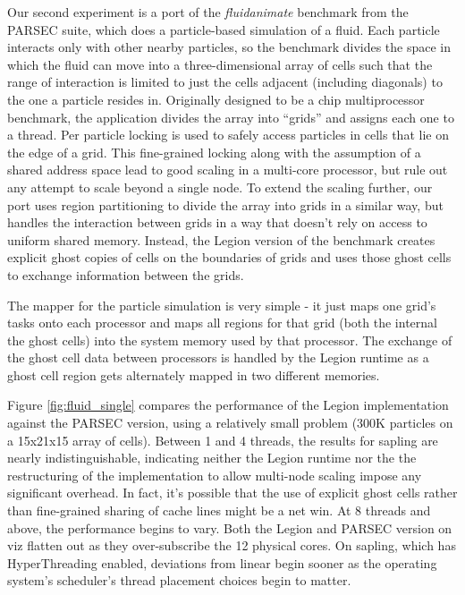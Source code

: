 Our second experiment is a port of the \emph{fluidanimate} benchmark from the PARSEC suite\cite{bienia11benchmarking},
which does a particle-based simulation of a fluid.  Each particle interacts only with other nearby
particles, so the benchmark divides the space in which the fluid
can move into a three-dimensional array of cells such that the range of interaction is limited to just the
cells adjacent (including diagonals) to the one a particle resides in.  Originally designed to be a
chip multiprocessor benchmark, the application divides the array into ``grids'' and assigns each one to 
a thread.  Per particle locking is used to safely access particles in cells that lie
on the edge of a grid.  This fine-grained locking along with the assumption of a shared address space lead to
good scaling in a multi-core processor, but rule out any attempt to scale beyond a single node.  To extend the
scaling further, our port uses region partitioning to divide the array into grids in a similar
way, but handles the interaction between grids in a way that doesn't rely on access to uniform shared memory.
Instead, the Legion version of the benchmark creates explicit ghost copies of cells on the boundaries of grids
and uses those ghost cells to exchange information between the grids.

The mapper for the particle simulation is very simple - it just maps one grid's tasks onto each processor and
maps all regions for that grid (both the internal the ghost cells) into the system memory used by that processor.
The exchange of the ghost cell data between processors is handled by the Legion runtime as a ghost cell region
gets alternately mapped in two different memories.

Figure \ref{fig:fluid_single} compares the performance of the Legion implementation against the PARSEC version,
using a relatively small problem (300K particles on a 15x21x15 array of cells).  Between 1 and 4 threads, the
results for sapling are nearly indistinguishable, indicating 
neither the Legion runtime nor the the restructuring of the implementation to allow multi-node scaling impose
any significant overhead.  In fact, it's possible that the use of explicit ghost cells rather than 
fine-grained sharing of cache lines might be a net win.  At 8 threads and above, the performance begins to vary.
Both the Legion and PARSEC version on viz flatten out as they over-subscribe the 12 physical cores.  On sapling,
which has HyperThreading enabled, deviations from linear begin sooner as the operating system's scheduler's
thread placement choices begin to matter.

